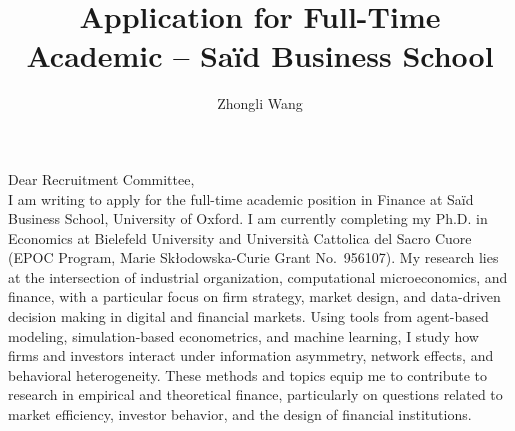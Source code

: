 \documentclass{nfr}
\title{Application for Full-Time Academic – Saïd Business School}
\author{Zhongli Wang}
\begin{document}

% 
% 
% 
% 


\maketitle


\noindent Dear Recruitment Committee,\\[0.2cm]

I am writing to apply for the full-time academic position in Finance at Saïd Business School, University of Oxford.
I am currently completing my Ph.D. in Economics at Bielefeld University and Università Cattolica del Sacro Cuore (EPOC Program, Marie Skłodowska-Curie Grant No.~956107). 
My research lies at the intersection of industrial organization, computational microeconomics, and finance, with a particular focus on firm strategy, market design, and data-driven decision making in digital and financial markets. 
Using tools from agent-based modeling, simulation-based econometrics, and machine learning, I study how firms and investors interact under information asymmetry, network effects, and behavioral heterogeneity. 
These methods and topics equip me to contribute to research in empirical and theoretical finance, particularly on questions related to market efficiency, investor behavior, and the design of financial institutions.\\
\end{document}
